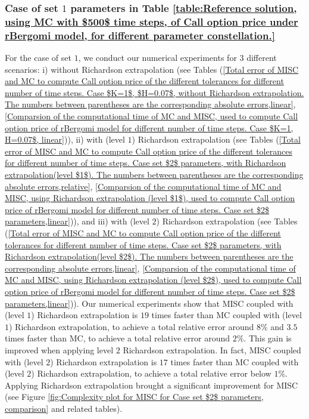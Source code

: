 \subsubsection{Case of set $1$ parameters in Table \ref{table:Reference solution, using MC with $500$ time steps, of Call option price under rBergomi model, for different parameter constellation.} }
\label{sec:Case of set $2$ parameters_linear}

For the case of set $1$, we conduct our numerical experiments for $3$ different scenarios: i) without Richardson extrapolation (see Tables (\ref{Total error of MISC and MC to compute Call option price of the different tolerances for different number of time steps. Case $K=1$, $H=0.07$, without Richardson extrapolation. The numbers between parentheses are the corresponding absolute errors,linear}, \ref{Comparsion of the computational time of  MC and MISC, used to compute Call option price of rBergomi model for different number of time steps. Case $K=1, H=0.07$, linear})), ii) with (level $1$) Richardson extrapolation (see Tables (\ref{Total  error of MISC and MC to compute Call option price of the different tolerances for different number of time steps. Case set $2$ parameters, with Richardson extrapolation(level $1$). The numbers between parentheses are the corresponding absolute errors,relative}, \ref{Comparsion of the computational time of  MC and MISC, using Richardson extrapolation (level $1$), used to compute Call option price of rBergomi model for different number of time steps. Case set $2$ parameters,linear})), and iii) with (level $2$) Richardson extrapolation (see Tables (\ref{Total  error of MISC and MC to compute Call option price of the different tolerances for different number of time steps. Case set $2$ parameters, with Richardson extrapolation(level $2$). The numbers between parentheses are the corresponding absolute errors,linear}, \ref{Comparsion of the computational time of  MC and MISC, using Richardson extrapolation (level $2$), used to compute Call option price of rBergomi model for different number of time steps. Case set $2$ parameters,linear})).  Our numerical experiments show that  MISC coupled with (level $1$) Richardson extrapolation is $19$ times faster than MC coupled with (level $1$) Richardson extrapolation, to achieve a total relative error around $8\%$ and $3.5$ times faster than MC, to achieve a total relative error around $2\%$. This gain is improved when applying level $2$ Richardson extrapolation. In fact,  MISC coupled with (level $2$)  Richardson extrapolation is $17$ times faster than MC coupled with (level $2$)  Richardson extrapolation, to achieve a total relative error below  $1\%$. Applying Richardson extrapolation brought a significant improvement for MISC (see Figure \ref{fig:Complexity plot for  MISC for Case set $2$ parameters, comparison} and related tables).

